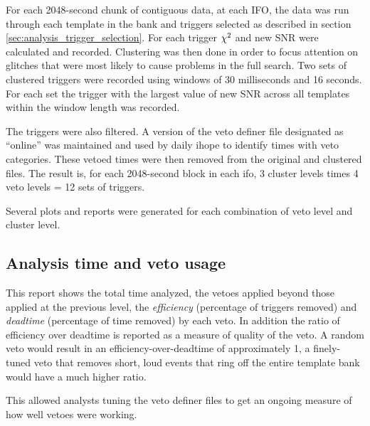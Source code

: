 For each 2048-second chunk of contiguous data, at each IFO, the data
was run through each template in the bank and triggers selected as
described in section \ref{sec:analysis_trigger_selection}. For each
trigger $\chi^2$ and new SNR were calculated and recorded.  Clustering
was then done in order to focus attention on glitches that were most
likely to cause problems in the full search.  Two sets of clustered
triggers were recorded using windows of 30 milliseconds and 16
seconds.  For each set the trigger with the largest value of new SNR
across all templates within the window length was recorded.

The triggers were also filtered.  A version of the veto definer file
designated as ``online'' was maintained and used by daily ihope to
identify times with veto categories.  These vetoed times were then
removed from the original and clustered files.  
The result is, for each 2048-second block in each ifo, 3 cluster
levels times 4 veto levels = 12 sets of triggers.



Several plots and reports were generated for each combination
of veto level and cluster level.

\subsection{Analysis time and veto usage}

This report shows the total time analyzed, the vetoes applied beyond
those applied at the previous level, the \emph{efficiency} (percentage of
triggers removed) and \emph{deadtime} (percentage of time removed) by
each veto.  In addition the ratio of efficiency over deadtime is
reported as a measure of quality of the veto.  A random veto would
result in an efficiency-over-deadtime of approximately 1, a
finely-tuned veto that removes short, loud events that ring off the
entire template bank would have a much higher ratio.

This allowed analysts tuning the veto definer files to get an ongoing
measure of how well vetoes were working.

